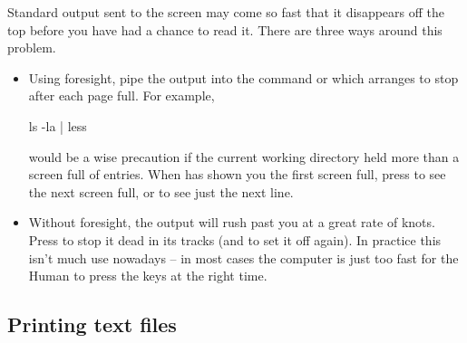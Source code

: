 Standard output sent to the screen may come so fast that it
disappears off the top before you have had a chance to read it.
There are three ways around this problem.
\begin{itemize}
\item Using foresight, pipe the output into the command 
  or 
  which arranges to stop after each page full. For example,
  \begin{ttoutenv}
  ls -la | less
  \end{ttoutenv}
  would be a wise precaution if the current working directory held
  more than a screen full of entries. When  has shown you the
  first screen full, press  to see the next screen full,
  or \return to see just the next line.
\item 
  Without foresight, the output will rush past you at a great rate
  of knots. Press  to stop it dead in its tracks
  (and  to set it off again).
  In practice this isn't much use nowadays -- in most cases the computer is
  just too fast for the Human to press the keys at the right time.
\end{itemize}
%
%
%
%

\subsection{Printing text files}

